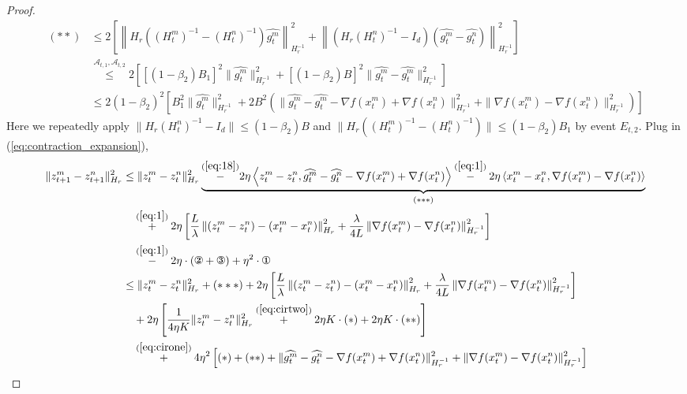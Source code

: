 \documentclass{article} %
\numberwithin{equation}{section}
\newcommand{\cirone}{\text{\ding{172}}}
\newcommand{\cirtwo}{\text{\ding{173}}}
\newcommand{\cirthree}{\text{\ding{174}}}
\renewcommand{\eqref}[1]{(\ref{#1})}
\begin{document}
\begin{proof}
\begin{equation}
        \begin{aligned}
            (**)
            &\leq 2\left[\left\| H_r((H_t^m)^{-1}-(H_t^n)^{-1})\widehat{g_t^m}\right\|_{H_r^{-1}}^2 + \left\|(H_r(H_t^n)^{-1}-I_d)(\widehat{g_t^m}-\widehat{g_t^n}) \right\|_{H_r^{-1}}^2\right] \\
            &\overset{\mathcal{A}_{t,1},\mathcal{A}_{t,2}}{\leq} 2\left[[(1-\beta_2)B_1]^2\|\widehat{g_t^m}\|_{H_r^{-1}}^2 + [(1-\beta_2)B]^2\|\widehat{g_t^m}-\widehat{g_t^m}\|_{H_r^{-1}}^2\right] \\
            &\leq 2(1-\beta_2)^2\left[ B_1^2\|\widehat{g_t^m}\|_{H_r^{-1}}^2 + 2B^2\left(\|\widehat{g_t^m}-\widehat{g_t^m}-\nabla f(x_t^m)+\nabla f(x_t^n)\|_{H_r^{-1}}^2+\|\nabla f(x_t^m)-\nabla f(x_t^n)\|_{H_r^{-1}}^2\right)\right]
        \end{aligned}
    \end{equation}
    Here we repeatedly apply $\|H_r(H_t^n)^{-1}-I_d\|\leq (1-\beta_2)B$ and $\|H_r((H_t^m)^{-1}-(H_t^n)^{-1})\|\leq (1-\beta_2)B_1$ by event $E_{t,2}$.
    Plug in \eqref{eq:contraction_expansion},
    \begin{equation}\label{eq:19}
        \begin{aligned}
            \|z_{t+1}^m-z_{t+1}^n\|_{H_r}^2
            &\leq \|z_t^m-z_t^n\|_{H_r}^2 \underbrace{\overset{\eqref{eq:18}}{-}2\eta \left\langle z_t^m-z_t^n, \widehat{g_t^m}-\widehat{g_t^n}-\nabla f(x_t^m)+\nabla f(x_t^n) \right\rangle \overset{\eqref{eq:1}}{-} 2\eta \left\langle x_t^m-x_t^n, \nabla f(x_t^m)-\nabla f(x_t^n)\right\rangle}_{(***)} \\
            &\quad \overset{\eqref{eq:1}}{+} 2\eta \left[\frac{L}{\lambda}\left\| (z_t^m-z_t^n)-(x_t^m-x_t^n) \right\|_{H_r}^2 + \frac{\lambda}{4L}\left\| \nabla f(x_t^m)-\nabla f(x_t^n) \right\|_{H_r^{-1}}^2\right] \\
            &\quad \overset{\eqref{eq:1}}{-} 2\eta\cdot(\cirtwo+\cirthree) + \eta^2\cdot\cirone  \\
            &\leq \|z_t^m-z_t^n\|_{H_r}^2 + (***) + 2\eta \left[\frac{L}{\lambda}\left\| (z_t^m-z_t^n)-(x_t^m-x_t^n) \right\|_{H_r}^2 + \frac{\lambda}{4L}\left\| \nabla f(x_t^m)-\nabla f(x_t^n) \right\|_{H_r^{-1}}^2\right] \\
            &\quad + 2\eta \left[\frac{1}{4\eta K}\|z_t^m-z_t^n\|_{H_r}^2 \overset{\eqref{eq:cirtwo}}{+} 2\eta K\cdot(*)+2\eta K\cdot(**)\right] \\
            &\quad \overset{\eqref{eq:cirone}}{+} 4\eta^2 \left[(*) + (**) + \|\widehat{g_t^m}-\widehat{g_t^n}-\nabla f(x_t^m)+\nabla f(x_t^n)\|_{H_r^{-1}}^2 + \|\nabla f(x_t^m)-\nabla f(x_t^n)\|_{H_r^{-1}}^2\right] \\

\end{aligned}
\end{equation}
\end{proof}
\end{document}
